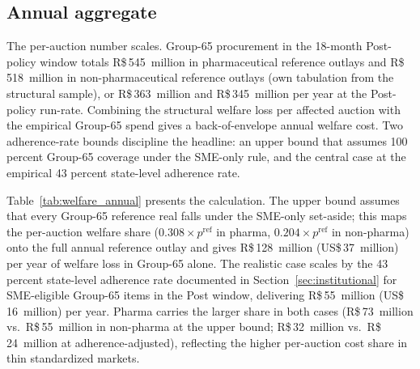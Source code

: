 \subsection{Annual aggregate}\label{sec:annual_aggregate}

The per-auction number scales. Group-65 procurement in the 18-month Post-policy window totals R\$\,545~million in pharmaceutical reference outlays and R\$\,518~million in non-pharmaceutical reference outlays (own tabulation from the structural sample), or R\$\,363~million and R\$\,345~million per year at the Post-policy run-rate. Combining the structural welfare loss per affected auction with the empirical Group-65 spend gives a back-of-envelope annual welfare cost. Two adherence-rate bounds discipline the headline: an upper bound that assumes 100 percent Group-65 coverage under the SME-only rule, and the central case at the empirical 43 percent state-level adherence rate.

Table~\ref{tab:welfare_annual} presents the calculation. The upper bound assumes that every Group-65 reference real falls under the SME-only set-aside; this maps the per-auction welfare share ($0.308 \times p^{\mathrm{ref}}$ in pharma, $0.204 \times p^{\mathrm{ref}}$ in non-pharma) onto the full annual reference outlay and gives R\$\,128~million (US\$\,37~million) per year of welfare loss in Group-65 alone. The realistic case scales by the 43 percent state-level adherence rate documented in Section~\ref{sec:institutional} for SME-eligible Group-65 items in the Post window, delivering R\$\,55~million (US\$\,16~million) per year. Pharma carries the larger share in both cases (R\$\,73~million vs.\ R\$\,55~million in non-pharma at the upper bound; R\$\,32~million vs.\ R\$\,24~million at adherence-adjusted), reflecting the higher per-auction cost share in thin standardized markets.

